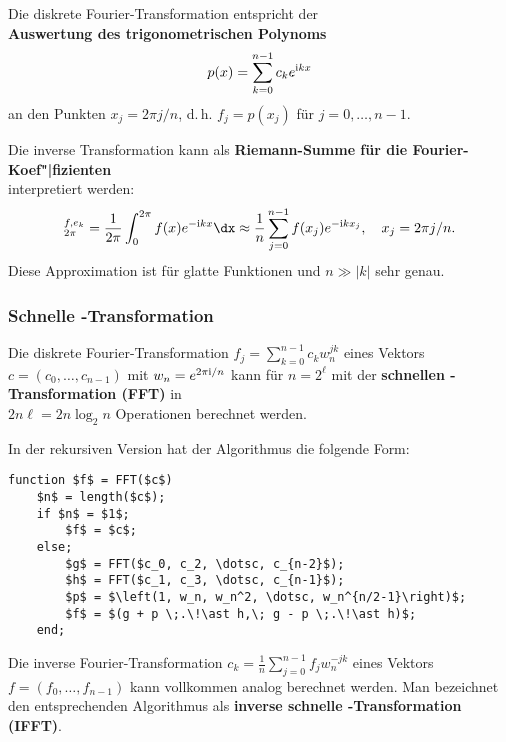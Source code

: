 \linie

Die diskrete Fourier-Transformation entspricht der \\
\textbf{Auswertung des trigonometrischen Polynoms}
\begin{align*}
    p(x) = \sum_{k=0}^{n-1} c_k e^{\mathrm{i} k x}
\end{align*}
an den Punkten $x_j = 2 \pi j / n$, d.\,h. $f_j = p(x_j)$ für
$j = 0, \dotsc, n - 1$.

\linie

Die inverse Transformation kann als
\textbf{Riemann-Summe für die Fourier-Koef"|fizienten} \\
interpretiert werden:
\begin{align*}
    \sp{f, e_k}_{2\pi} = \frac{1}{2\pi} \int_0^{2\pi} f(x) e^{-\i k x} \dx
    \approx \frac{1}{n} \sum_{j=0}^{n-1} f(x_j) e^{-\i k x_j}, \quad
    x_j = 2 \pi j / n.
\end{align*}
Diese Approximation ist für glatte Funktionen und $n \gg |k|$ sehr genau.

\subsubsection{%
    Schnelle -Transformation%
}

Die diskrete Fourier-Transformation $f_j = \sum_{k=0}^{n-1} c_k w_n^{jk}$
eines Vektors $c = (c_0, \dotsc, c_{n-1})$ mit $w_n = e^{2\pi\mathrm{i}/n}$
kann für $n = 2^\ell$ mit der
\textbf{schnellen -Transformation (FFT)} in \\
$2n\ell = 2 n \log_2 n$ Operationen berechnet werden.

In der rekursiven Version hat der Algorithmus die folgende Form:
\begin{lstlisting}[mathescape]
function $f$ = FFT($c$)
    $n$ = length($c$);
    if $n$ = $1$;
        $f$ = $c$;
    else;
        $g$ = FFT($c_0, c_2, \dotsc, c_{n-2}$);
        $h$ = FFT($c_1, c_3, \dotsc, c_{n-1}$);
        $p$ = $\left(1, w_n, w_n^2, \dotsc, w_n^{n/2-1}\right)$;
        $f$ = $(g + p \;.\!\ast h,\; g - p \;.\!\ast h)$;
    end;
\end{lstlisting}

\linie
\pagebreak

Die inverse Fourier-Transformation
$c_k = \frac{1}{n} \sum_{j=0}^{n-1} f_j w_n^{-jk}$
eines Vektors $f = (f_0, \dotsc, f_{n-1})$
kann vollkommen analog berechnet werden.
Man bezeichnet den entsprechenden Algorithmus als
\textbf{inverse schnelle -Transformation (IFFT)}.

